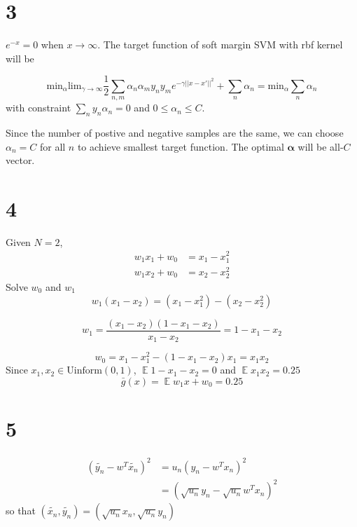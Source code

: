 \documentclass[12pt]{article}
\DeclareMathOperator{\E}{\mathbb{E}}
\begin{document}
\section*{3}
$e^{-x} = 0$ when $x\rightarrow\infty$. The target function of soft margin SVM with rbf kernel will be 

$$
\text{min}_\alpha \text{lim}_{\gamma \rightarrow \infty}\frac{1}{2} \sum_{n,m} \alpha_n\alpha_my_ny_me^{-\gamma||x-x'||^2} + \sum_n \alpha_n
= \text{min}_\alpha \sum_n \alpha_n
$$
with constraint $\sum_n y_n \alpha_n = 0$ and $0 \leq \alpha_n \leq C$.

Since the number of postive and negative samples are the same, 
we can choose $\alpha_n = C$ for all $n$ to achieve smallest target function.
The optimal $\bm{\alpha}$ will be all-$C$ vector.
\section*{4}
Given $N=2$,
\begin{equation*}
    \begin{split}
        w_1 x_1 + w_0 &= x_1 - x_1^2 \\
        w_1 x_2 + w_0 &= x_2 - x_2^2
    \end{split}
\end{equation*}
Solve $w_0$ and $w_1$ 
\[
    w_1(x_1 - x_2) = (x_1 - x_1^2) - (x_2 - x_2^2)
\]

\[
    w_1 = \frac{(x_1 - x_2) (1-x_1-x_2)}{x_1-x_2} = 1-x_1-x_2
\]

\[
    w_0 = x_1 - x_1^2 - (1 - x_1 - x_2) x_1 = x_1 x_2
\]
Since $x_1, x_2 \in \text{Uinform}(0, 1)$, $\E 1-x_1-x_2 = 0$ and $\E x_1x_2 = 0.25$
\[
    \bar{g}(x) = \E w_1 x + w_0 = 0.25 
\]
\section*{5}

\begin{equation*}
\begin{split}
    (\tilde{y_n} - w^T \tilde{x_n})^2 &= u_n (y_n - w^Tx_n)^2 \\
    &=  (\sqrt{u_n} y_n - \sqrt{u_n}w^Tx_n)^2
\end{split}
\end{equation*}
so that $(\tilde{x_n}, \tilde{y_n}) = (\sqrt{u_n}x_n, \sqrt{u_n}y_n)$
\end{document}
